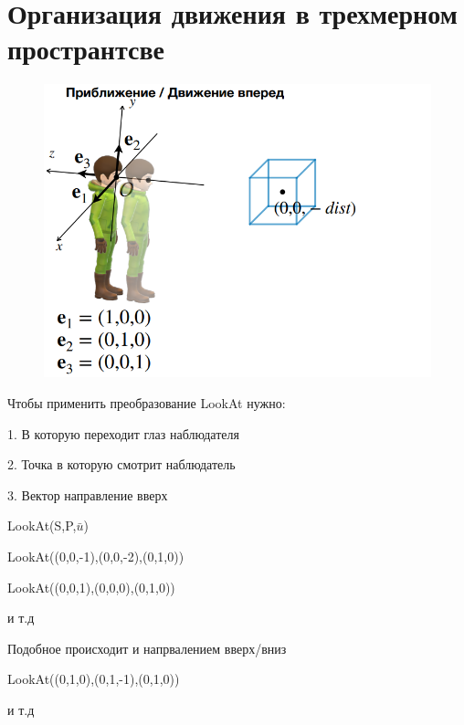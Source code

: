 \documentclass{article}
\begin{document}
\section{Организация движения в трехмерном пространтсве}

\begin{figure} [H]
    \includegraphics[width=0.70\linewidth]{Снимок экрана 2025-04-14 133843.png}
\end{figure}



Чтобы применить преобразование LookAt нужно:

1. В которую переходит глаз наблюдателя

2. Точка в которую смотрит наблюдатель

3. Вектор направление вверх

LookAt(S,P,$\bar{u}$)


LookAt((0,0,-1),(0,0,-2),(0,1,0))

LookAt((0,0,1),(0,0,0),(0,1,0))

и т.д 

Подобное происходит и напрвалением вверх/вниз

LookAt((0,1,0),(0,1,-1),(0,1,0))

и т.д
\end{document}
